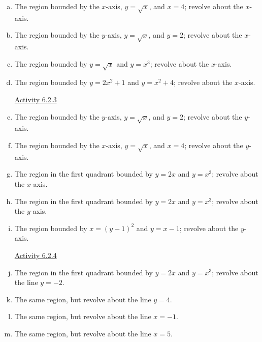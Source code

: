 \documentclass[12pt]{article}
\begin{document}
\begin{enumerate}[a.]
\item The region bounded by the $x$-axis, $y=\sqrt{x}$, and $x=4$; revolve about the $x$-axis.
\item The region bounded by the $y$-axis, $y=\sqrt{x}$, and $y=2$; revolve about the $x$-axis.
\item The region bounded by $y=\sqrt{x}$ and $y=x^3$; revolve about the $x$-axis.
\item The region bounded by $y=2x^2+1$ and $y=x^2 + 4$; revolve about the $x$-axis.


\vfill

\hspace{-1.5em} \href{https://activecalculus.org/single/sec-6-2-volume.html#act-6-2-2}{Activity 6.2.3} \hrulefill

\item The region bounded by the $y$-axis, $y=\sqrt{x}$, and $y=2$; revolve about the $y$-axis.
\item The region bounded by the $x$-axis, $y=\sqrt{x}$, and $x=4$; revolve about the $y$-axis.
\item The region in the first quadrant bounded by $y=2x$ and $y=x^3$; revolve about the $x$-axis.
\item The region in the first quadrant bounded by $y=2x$ and $y=x^3$; revolve about the $y$-axis.
\item The region bounded by $x=(y-1)^2$ and $y=x-1$; revolve about the $y$-axis.

\vfill

\hspace{-1.5em} \href{https://activecalculus.org/single/sec-6-2-volume.html#act-6-2-3}{Activity 6.2.4} \hrulefill
\item The region in the first quadrant bounded by $y=2x$ and $y=x^3$; revolve about the line $y=-2$.
\item The same region, but revolve about the line $y=4$.
\item The same region, but revolve about the line $x=-1$.
\item The same region, but revolve about the line $x=5$.

\end{enumerate}
\end{document}
